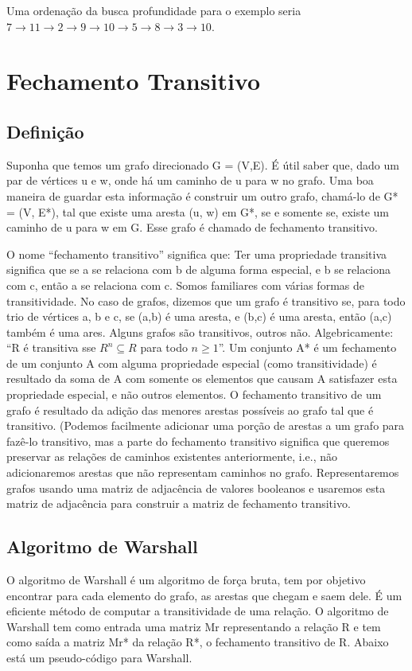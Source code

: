\documentclass[a4paper,12pt]{article}
\begin{document}
Uma ordenação da busca profundidade para o exemplo seria $7 \to 11 \to 2 \to 9 \to 10 \to 5 \to 8 \to 3 \to 10$.
\newpage
\section{Fechamento Transitivo}

\subsection{Definição}
Suponha que temos um grafo direcionado G = (V,E). É útil saber que, dado um par de vértices u e w, onde há um caminho de u para w no grafo. Uma boa maneira de guardar esta informação é construir um outro grafo, chamá-lo de G* = (V, E*), tal que existe uma aresta (u, w) em G*, se e somente se, existe um caminho de u para w em G. Esse grafo é chamado de fechamento transitivo.

O nome “fechamento transitivo” significa que:
	Ter uma propriedade transitiva significa que se a se relaciona com b de alguma forma especial, e b se relaciona com c, então a se relaciona com c. Somos familiares com várias formas de transitividade. No caso de grafos, dizemos que um grafo é transitivo se, para todo trio de vértices a, b e c, se (a,b) é uma aresta, e (b,c) é uma aresta, então (a,c) também é uma ares. Alguns grafos são transitivos, outros não. Algebricamente: “R é transitiva sse $R^n \subseteq R$ para todo $n \geq 1$”. 
	Um conjunto A* é um fechamento de um conjunto A com alguma propriedade especial (como transitividade) é resultado da soma de A com somente os elementos que causam A satisfazer esta propriedade especial, e não outros elementos. O fechamento transitivo de um grafo é resultado da adição das menores arestas possíveis ao grafo tal que é transitivo. (Podemos facilmente adicionar uma porção de arestas a um grafo para fazê-lo transitivo, mas a parte do fechamento transitivo significa que queremos preservar as relações de caminhos existentes anteriormente, i.e., não adicionaremos arestas que não representam caminhos no grafo.
	Representaremos grafos usando uma matriz de adjacência de valores booleanos e usaremos esta matriz de adjacência para construir a matriz de fechamento transitivo. 

\subsection{Algoritmo de Warshall}
	
O algoritmo de Warshall é um algoritmo de força bruta, tem por objetivo encontrar para cada elemento do grafo, as arestas que chegam e saem dele. É um eficiente método de computar a transitividade de uma relação. O algoritmo de Warshall tem como entrada uma matriz Mr representando a relação R e tem como saída a matriz Mr* da relação R*, o fechamento transitivo de R. Abaixo está um pseudo-código para Warshall.
\end{document}
